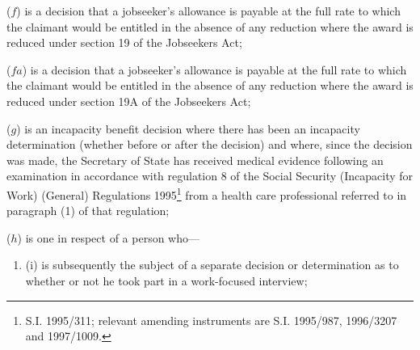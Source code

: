 \documentclass[12pt,a4paper]{article}
\begin{document}
\begin{enumerate}

%

($f$) is a decision that a jobseeker’s allowance is payable at the full rate to which the claimant would be entitled in the absence of any reduction where the award is reduced under section 19 of the Jobseekers Act;

($fa$) is a decision that a jobseeker’s allowance is payable at the full rate to which the claimant would be entitled in the absence of any reduction where the award is reduced under section 19A of the Jobseekers Act;

($g$) is an incapacity benefit decision where there has been an incapacity determination (whether before or after the decision) and where, since the decision was made, the Secretary of State has received medical evidence following an examination in accordance with regulation 8 of the Social Security (Incapacity for Work) (General) Regulations 1995\footnote{\frenchspacing S.I. 1995/311; relevant amending instruments are S.I. 1995/987, 1996/3207 and 1997/1009.} from a 
health care professional  %
referred to in paragraph (1) of that regulation;

($h$) is one in respect of a person who—
\begin{enumerate}\item[]
(i) is subsequently the subject of a separate decision or determination as to whether or not he took part in a work-focused interview;


\end{enumerate}
\end{enumerate}
\end{document}
